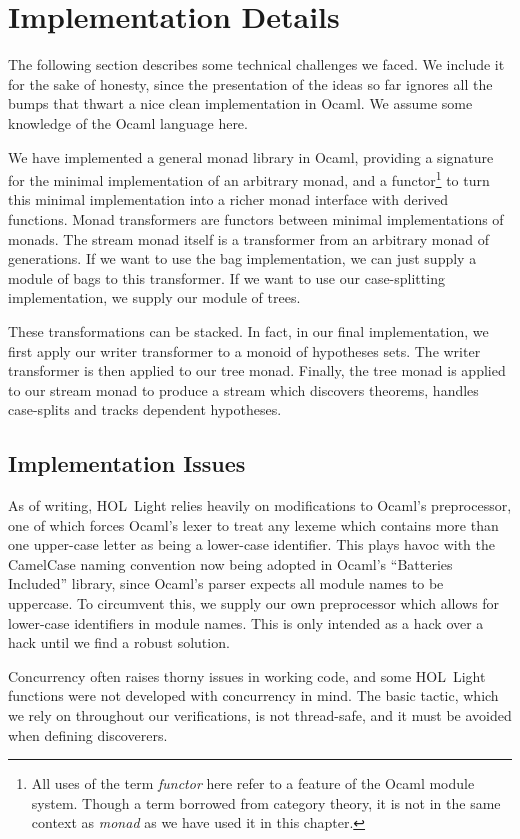 \section{Implementation Details}
The following section describes some technical challenges we faced. We include it for the sake of honesty, since the presentation of the ideas so far ignores all the bumps that thwart a nice clean implementation in Ocaml. We assume some knowledge of the Ocaml language here.

We have implemented a general monad library in Ocaml, providing a signature for the minimal implementation of an arbitrary monad, and a functor\footnote{All uses of the term \emph{functor} here refer to a feature of the Ocaml module system. Though a term borrowed from category theory, it is not in the same context as \emph{monad} as we have used it in this chapter.} to turn this minimal implementation into a richer monad interface with derived functions. Monad transformers are functors between minimal implementations of monads. The stream monad itself is a transformer from an arbitrary monad of generations. If we want to use the bag implementation, we can just supply a module of bags to this transformer. If we want to use our case-splitting implementation, we supply our module of trees. 

These transformations can be stacked. In fact, in our final implementation, we first apply our writer transformer to a monoid of hypotheses sets. The writer transformer is then applied to our tree monad. Finally, the tree monad is applied to our stream monad to produce a stream which discovers theorems, handles case-splits and tracks dependent hypotheses.

\subsection{Implementation Issues}
As of writing, HOL~Light relies heavily on modifications to Ocaml's preprocessor, one of which forces Ocaml's lexer to treat any lexeme which contains more than one upper-case letter as being a lower-case identifier. This plays havoc with the CamelCase naming convention now being adopted in Ocaml's ``Batteries Included'' library, since Ocaml's parser expects all module names to be uppercase. To circumvent this, we supply our own preprocessor which allows for lower-case identifiers in module names. This is only intended as a hack over a hack until we find a robust solution.

Concurrency often raises thorny issues in working code, and some HOL~Light functions were not developed with concurrency in mind. The basic  tactic, which we rely on throughout our verifications, is not thread-safe, and it must be avoided when defining discoverers.

